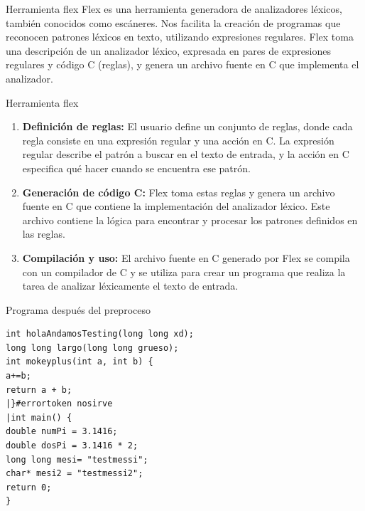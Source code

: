 \documentclass{beamer}
\begin{document}
\begin{frame}{Herramienta flex}
Flex es una herramienta generadora de analizadores léxicos, también conocidos como escáneres. Nos facilita la creación de programas que reconocen patrones léxicos en texto, utilizando expresiones regulares. Flex toma una descripción de un analizador léxico, expresada en pares de expresiones regulares y código C (reglas), y genera un archivo fuente en C que implementa el analizador.
\end{frame}

\begin{frame}{Herramienta flex}
\begin{enumerate}
 \item<1-> \textbf{Definición de reglas:} El usuario define un conjunto de reglas, donde cada regla consiste en una expresión regular y una acción en C. La expresión regular describe el patrón a buscar en el texto de entrada, y la acción en C especifica qué hacer cuando se encuentra ese patrón.
 \item<2-> \textbf{Generación de código C:} Flex toma estas reglas y genera un archivo fuente en C que contiene la implementación del analizador léxico. Este archivo contiene la lógica para encontrar y procesar los patrones definidos en las reglas.
 \item<3> \textbf{Compilación y uso:} El archivo fuente en C generado por Flex se compila con un compilador de C y se utiliza para crear un programa que realiza la tarea de analizar léxicamente el texto de entrada.
\end{enumerate}
\end{frame}

\begin{frame}[fragile]{Programa después del preproceso}{}

  \begin{lstlisting}[style=mycstyle]
int holaAndamosTesting(long long xd);
long long largo(long long grueso);
int mokeyplus(int a, int b) {
a+=b;
return a + b; 
|}#errortoken nosirve
|int main() {
double numPi = 3.1416;
double dosPi = 3.1416 * 2;
long long mesi= "testmessi"; 
char* mesi2 = "testmessi2"; 
return 0;
}  \end{lstlisting}
\end{frame}
\end{document}
